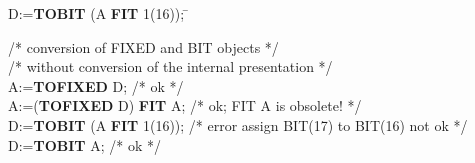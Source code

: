 \begin{tabbing}
D:={\bf TOBIT} (A {\bf FIT} 1(16)); \x \= \kill

/* conversion of FIXED and BIT objects  */ \\
/* without conversion of the internal presentation */ \\
A:={\bf TOFIXED} D; \> /* ok */\\
A:=({\bf TOFIXED} D) {\bf FIT} A; \> /* ok; FIT A is obsolete! */\\
D:={\bf TOBIT} (A {\bf FIT} 1(16));  \> /* error assign BIT(17) to BIT(16) not ok */  \\
D:={\bf TOBIT} A;    \> /* ok */
\end{tabbing}

